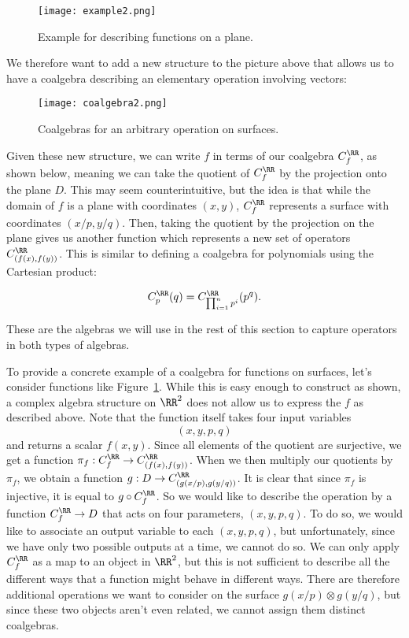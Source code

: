 \documentclass[a4paper,reqno,oneside]{article}
\begin{document}
\begin{figure}[h]
    \centering
    \texttt{[image: example2.png]}
    \caption{Example for describing functions on a plane.}
    \label{fig:function}
\end{figure}

We therefore want to add a new structure to the picture above that allows us to have a coalgebra describing an elementary operation involving vectors:

\begin{figure}[h]
    \centering
    \texttt{[image: coalgebra2.png]}
    \caption{Coalgebras for an arbitrary operation on surfaces.}
    \label{fig:coalg2}
\end{figure}

Given these new structure, we can write $f$ in terms of our coalgebra $C^{\RR}_f$, as shown below, meaning we can take the quotient of $C^{\RR}_f$ by the projection onto the plane $D$. This may seem counterintuitive, but the idea is that while the domain of $f$ is a plane with coordinates $(x,y)$, $C^{\RR}_f$ represents a surface with coordinates $(x/p,y/q)$. Then, taking the quotient by the projection on the plane gives us another function which represents a new set of operators $C^\RR_{(f(x),f(y))}$. This is similar to defining a coalgebra for polynomials using the Cartesian product: 

\begin{equation}
    C^\RR_p(q) = C^\RR_{\prod_{i=1}^n p^i}(p^q).
\end{equation}

These are the algebras we will use in the rest of this section to capture operators in both types of algebras.

To provide a concrete example of a coalgebra for functions on surfaces, let's consider functions like Figure~\ref{fig:function}. While this is easy enough to construct as shown, a complex algebra structure on $\RR^2$ does not allow us to express the $f$ as described above. Note that the function itself takes four input variables $$(x,y,p,q)$$ and returns a scalar $f(x,y)$. Since all elements of the quotient are surjective, we get a function $\pi_f : C^{\RR}_f \to C^\RR_{(f(x),f(y))}$. When we then multiply our quotients by $\pi_f$, we obtain a function $g : D \to C^\RR_{(g(x/p), g(y/q))}$. It is clear that since $\pi_f$ is injective, it is equal to $g \circ C^\RR_f$. So we would like to describe the operation by a function $C^\RR_f \to D$ that acts on four parameters, $(x,y,p,q)$. To do so, we would like to associate an output variable to each $(x,y,p,q)$, but unfortunately, since we have only two possible outputs at a time, we cannot do so. We can only apply $C^\RR_f$ as a map to an object in $\RR^2$, but this is not sufficient to describe all the different ways that a function might behave in different ways. There are therefore additional operations we want to consider on the surface $g(x/p) \otimes g(y/q)$, but since these two objects aren't even related, we cannot assign them distinct coalgebras.
\end{document}

